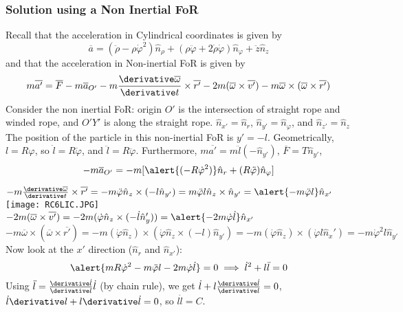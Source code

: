 \begin{frame}
\frametitle{Solution using a Non Inertial FoR}
Recall that the acceleration in Cylindrical coordinates is given by
\[\overline{a}=(\ddot\rho-\rho\dot\varphi^2)\hat n_\rho+(\rho\ddot\varphi+2\dot\rho\dot\varphi)\hat n_\varphi+\ddot z\hat n_z\]
and that the acceleration in Non-inertial FoR is given by
\[m\overline{a'}=\overline{F}-m\overline{a}_{O'}-m\frac{\derivative\overline{\omega}}{\derivative t}\times\overline{r'}-2m(\overline{\omega}\times\overline{v'})-m\overline{\omega}\times(\overline{\omega}\times\overline{r'})\]
Consider the non inertial FoR: origin $O'$ is the intersection of  straight rope and winded rope, and $O'Y'$ is along the straight rope. $\hat{n}_{x'}=\hat{n}_r$, $\hat{n}_{y'}=\hat{n}_{\varphi}$, and $\hat{n}_{z'}=\hat{n}_{z}$ The position of the particle in this non-inertial FoR is $y'=-l$. Geometrically, $l=R\varphi$, so $\dot l=R\dot\varphi$, and $\ddot l=R\ddot \varphi$. Furthermore, $m\overline{a'}=m\ddot l(-\hat n_{y'})$, $\overline F=T\hat{n}_{y'}$, \[-m\overline{a}_{O'}=-m[\alert{(-R\dot\varphi ^2)}\hat n_r+(R\ddot \varphi)\hat n_\varphi]\]
\end{frame}
\begin{frame}
$-m\frac{\derivative\overline{\omega}}{\derivative t}\times\overline{r'}=-m\ddot\varphi\hat n_z\times (-l\hat n_{y'})=m\ddot\varphi l\hat n_z\times\hat n_{y'}=\alert{-m\ddot\varphi l}\hat n_{x'}$
\texttt{[image: RC6LIC.JPG]}\\
$-2m(\overline{\omega}\times\overline{v'})=-2m(\dot\varphi\hat n_z\times (-\dot l\hat n_y'))=\alert{-2m\dot\varphi\dot l}\hat n_{x'}$\\
$-m\overline{\omega}\times(\overline\omega\times\overline{r'})=-m(\dot\varphi\hat n_z)\times(\dot\varphi\hat n_z\times (-l)\hat n_{y'})=-m(\dot\varphi\hat n_z)\times(\dot\varphi l\hat n_x')=-m\dot\varphi ^2l\hat n_{y'}$
Now look at the \alert{$x'$} direction ($\hat n_r$ and $\hat n_{x'}$):
\[\alert{mR\dot\varphi^2-m\ddot\varphi l-2m\dot\varphi\dot l}=0\implies \dot {l}^2+l\ddot {l}=0\]
Using $\ddot l=\frac{\derivative \dot l}{\derivative l}\dot l$ (by chain rule), we get $\dot l+l\frac{\derivative\dot l}{\derivative l}=0$, $\dot l\derivative l+l\derivative\dot l=0$, so $l\dot l=C$.
\end{frame}
